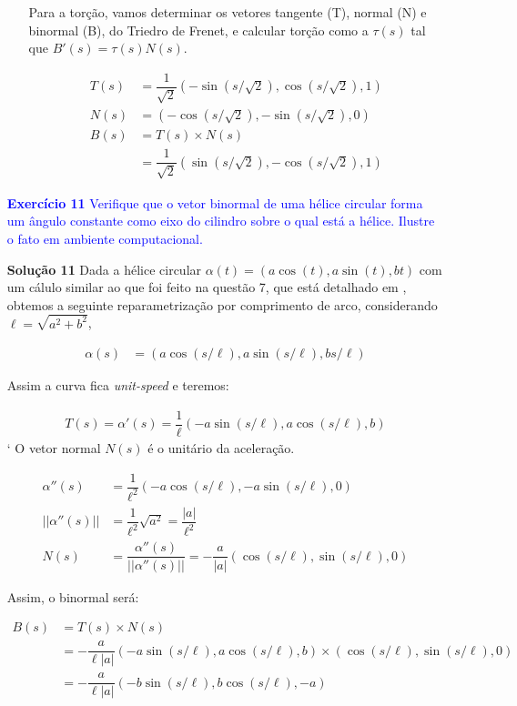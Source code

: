\documentclass[12pt,letterpaper]{article}
\newcommand{\ex}[1]{\textcolor{blue}{\textbf{Exercício #1}}}
\newcommand{\sol}[1]{\textbf{Solução #1}}
\begin{document}
\begin{enumerate}
\begin{enumerate}[(a)]
		Para a torção, vamos determinar os vetores tangente (T), normal (N) e binormal (B), do Triedro de Frenet, e calcular torção como a $\tau(s)$ tal que $B'(s)=\tau(s)N(s)$.
		
		\begin{align*}
			T(s)&=\dfrac{1}{\sqrt2}(-\sin (s/\sqrt2),\cos (s/\sqrt2),1)\\
			N(s)&=(-\cos (s/\sqrt2),-\sin (s/\sqrt2),0)\\
			B(s)&=T(s)\times N(s)\\&=\dfrac{1}{\sqrt2}(\sin(s/\sqrt2),-\cos(s/\sqrt2),1)
		\end{align*}
		\end{enumerate}
	\item[\ex{11}]\textcolor{blue}{Verifique que o vetor binormal de uma hélice circular forma um ângulo constante como eixo do cilindro sobre o qual está a hélice. Ilustre o fato em ambiente computacional.}
	
	\item[\sol{11}] Dada a hélice circular $\alpha(t)=(a\cos(t),a\sin(t),bt)$ com um cálulo similar ao que foi feito na questão 7, que está detalhado em \cite{ronaldo}, obtemos a seguinte reparametrização por comprimento de arco, considerando $\ell=\sqrt{a^2+b^2}$,
	
	\begin{align*}
		\alpha(s)&=\left(a\cos\left(s/\ell\right),a\sin\left(s/\ell\right),bs/{\ell}\right)
	\end{align*}
	
	Assim a curva fica \textit{unit-speed} e teremos:
	
	\begin{align*}
		T(s)=\alpha'(s)=\dfrac1\ell(-a\sin(s/\ell),a\cos(s/\ell),b)
	\end{align*}
	`
	O vetor normal $N(s)$ é o unitário da aceleração. 
	
	\begin{align*}
		\alpha''(s)&=\dfrac{1}{\ell^2}(-a\cos(s/\ell),-a\sin(s/\ell),0)\\
		||\alpha''(s)||&=\dfrac{1}{\ell^2}\sqrt{a^2}=\dfrac{|a|}{\ell^2}\\
		N(s)&=\dfrac{\alpha''(s)}{||\alpha''(s)||}=-\dfrac{a}{|a|}(\cos(s/\ell),\sin(s/\ell),0)
	\end{align*}
	
	Assim, o binormal será:
	
	\begin{align*}
		B(s)&=T(s)\times N(s)\\
		&=-\dfrac{a}{\ell|a|}(-a\sin(s/\ell),a\cos(s/\ell),b)\times(\cos(s/\ell),\sin(s/\ell),0)\\
		&=-\dfrac{a}{\ell|a|}(-b\sin(s/\ell),b\cos(s/\ell),-a)
	\end{align*}


\end{enumerate}
\end{document}
